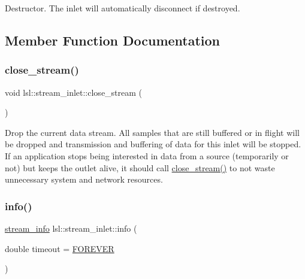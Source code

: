 Destructor. The inlet will automatically disconnect if destroyed. 

\subsection{Member Function Documentation}
\mbox{\label{classlsl_1_1stream__inlet_a77c2f10ed843723c7473aa52dcf544a0}} 
\subsubsection{\texorpdfstring{close\+\_\+stream()}{close\_stream()}}
{\footnotesize\ttfamily void lsl\+::stream\+\_\+inlet\+::close\+\_\+stream (\begin{DoxyParamCaption}{ }\end{DoxyParamCaption})\hspace{0.3cm}{\ttfamily [inline]}}

Drop the current data stream. All samples that are still buffered or in flight will be dropped and transmission and buffering of data for this inlet will be stopped. If an application stops being interested in data from a source (temporarily or not) but keeps the outlet alive, it should call \hyperlink{classlsl_1_1stream__inlet_a77c2f10ed843723c7473aa52dcf544a0}{close\+\_\+stream()} to not waste unnecessary system and network resources. \mbox{\label{classlsl_1_1stream__inlet_ae895a8d5c10dc4072e969686fc402b5b}} 
\subsubsection{\texorpdfstring{info()}{info()}}
{\footnotesize\ttfamily \hyperlink{classlsl_1_1stream__info}{stream\+\_\+info} lsl\+::stream\+\_\+inlet\+::info (\begin{DoxyParamCaption}\item[{double}]{timeout = {\ttfamily \hyperlink{namespacelsl_a74cfbc9077aca21295117217249721ed}{F\+O\+R\+E\+V\+ER}} }\end{DoxyParamCaption})\hspace{0.3cm}{\ttfamily [inline]}}

